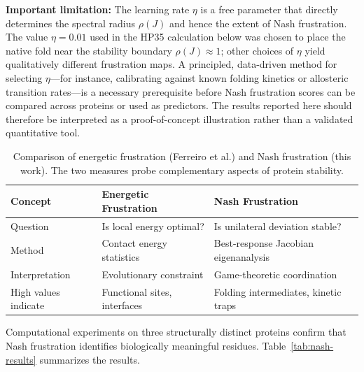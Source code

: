 \documentclass[12pt,a4paper]{article}
\theoremstyle{remark}
\begin{document}
\textbf{Important limitation:} The learning rate $\eta$ is a free parameter that directly determines the spectral radius $\rho(J)$ and hence the extent of Nash frustration. The value $\eta = 0.01$ used in the HP35 calculation below was chosen to place the native fold near the stability boundary $\rho(J) \approx 1$; other choices of $\eta$ yield qualitatively different frustration maps. A principled, data-driven method for selecting $\eta$---for instance, calibrating against known folding kinetics or allosteric transition rates---is a necessary prerequisite before Nash frustration scores can be compared across proteins or used as predictors. The results reported here should therefore be interpreted as a proof-of-concept illustration rather than a validated quantitative tool.

\begin{table}[ht]
\centering
\caption{Comparison of energetic frustration (Ferreiro et al.) and Nash frustration (this work). The two measures probe complementary aspects of protein stability.}
\label{tab:frustration-comparison}
\begin{tabular}{lll}
\toprule
\textbf{Concept} & \textbf{Energetic Frustration} & \textbf{Nash Frustration} \\
\midrule
Question & Is local energy optimal? & Is unilateral deviation stable? \\
Method & Contact energy statistics & Best-response Jacobian eigenanalysis \\
Interpretation & Evolutionary constraint & Game-theoretic coordination \\
High values indicate & Functional sites, interfaces & Folding intermediates, kinetic traps \\
\bottomrule
\end{tabular}
\end{table}

Computational experiments on three structurally distinct proteins confirm that Nash frustration identifies biologically meaningful residues. Table~\ref{tab:nash-results} summarizes the results.
\end{document}
